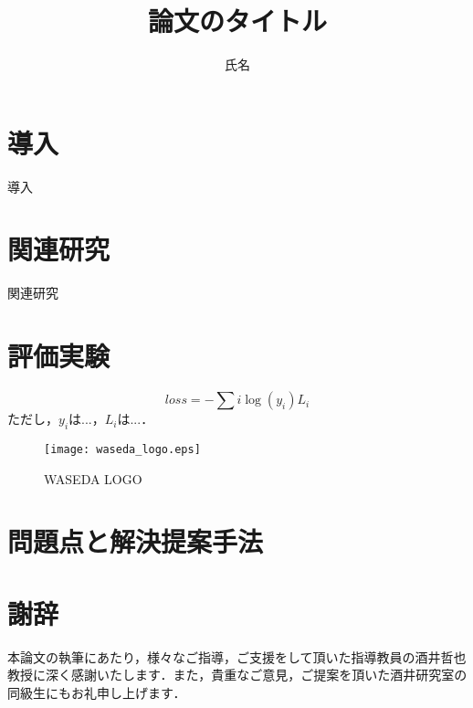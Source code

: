 \documentclass[12pt,dvipdfmx]{jsbook}
\title{論文のタイトル}
\affiliation{早稲田大学基幹理工学部情報理工学科}
\author{氏名}
\begin{document}
\maketitle

\begin{coverabstract}

\end{coverabstract}

\tableofcontents

\vspace*{1cm}\par
\chapter{導入}
\label{sec:introduction}
導入

\chapter{関連研究}
\label{sec:related_work}
関連研究\cite{RSL}

\chapter{評価実験}
\begin{equation}
    loss = -\sum{i}{}\log (y_i)L_i
\end{equation}
ただし，$y_i$は...，$L_i$は...．

\begin{figure}[h]
  \centering
  \texttt{[image: waseda\_logo.eps]}
  \caption{WASEDA LOGO}
  \label{logo}
\end{figure}

\chapter{問題点と解決提案手法}

\chapter*{謝辞}
本論文の執筆にあたり，様々なご指導，ご支援をして頂いた指導教員の酒井哲也教授に深く感謝いたします．また，貴重なご意見，ご提案を頂いた酒井研究室の同級生にもお礼申し上げます．
\newpage



\newpage

%
%
\end{document}
